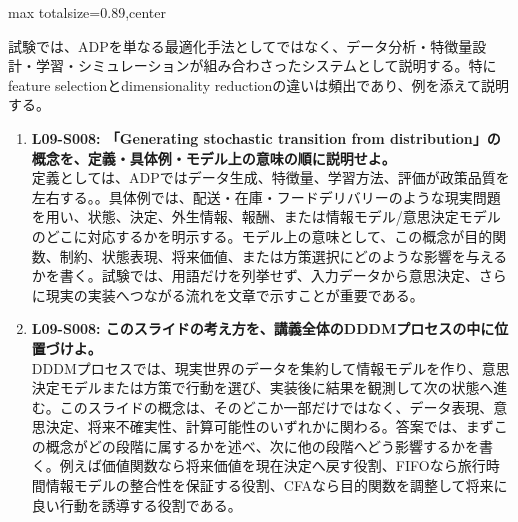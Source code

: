 \begin{minipage}[t]{0.58\textwidth}
\begin{adjustbox}{max totalsize={\textwidth}{0.89\textheight},center}
\begin{minipage}{\textwidth}
試験では、ADPを単なる最適化手法としてではなく、データ分析・特徴量設計・学習・シミュレーションが組み合わさったシステムとして説明する。特にfeature selectionとdimensionality reductionの違いは頻出であり、例を添えて説明する。\par{}\begin{enumerate}\item \textbf{L09-S008: 「Generating stochastic transition from distribution」の概念を、定義・具体例・モデル上の意味の順に説明せよ。}\\定義としては、ADPではデータ生成、特徴量、学習方法、評価が政策品質を左右する。。具体例では、配送・在庫・フードデリバリーのような現実問題を用い、状態、決定、外生情報、報酬、または情報モデル/意思決定モデルのどこに対応するかを明示する。モデル上の意味として、この概念が目的関数、制約、状態表現、将来価値、または方策選択にどのような影響を与えるかを書く。試験では、用語だけを列挙せず、入力データから意思決定、さらに現実の実装へつながる流れを文章で示すことが重要である。\item \textbf{L09-S008: このスライドの考え方を、講義全体のDDDMプロセスの中に位置づけよ。}\\DDDMプロセスでは、現実世界のデータを集約して情報モデルを作り、意思決定モデルまたは方策で行動を選び、実装後に結果を観測して次の状態へ進む。このスライドの概念は、そのどこか一部だけではなく、データ表現、意思決定、将来不確実性、計算可能性のいずれかに関わる。答案では、まずこの概念がどの段階に属するかを述べ、次に他の段階へどう影響するかを書く。例えば価値関数なら将来価値を現在決定へ戻す役割、FIFOなら旅行時間情報モデルの整合性を保証する役割、CFAなら目的関数を調整して将来に良い行動を誘導する役割である。\end{enumerate}
\end{minipage}
\end{adjustbox}
\end{minipage}


